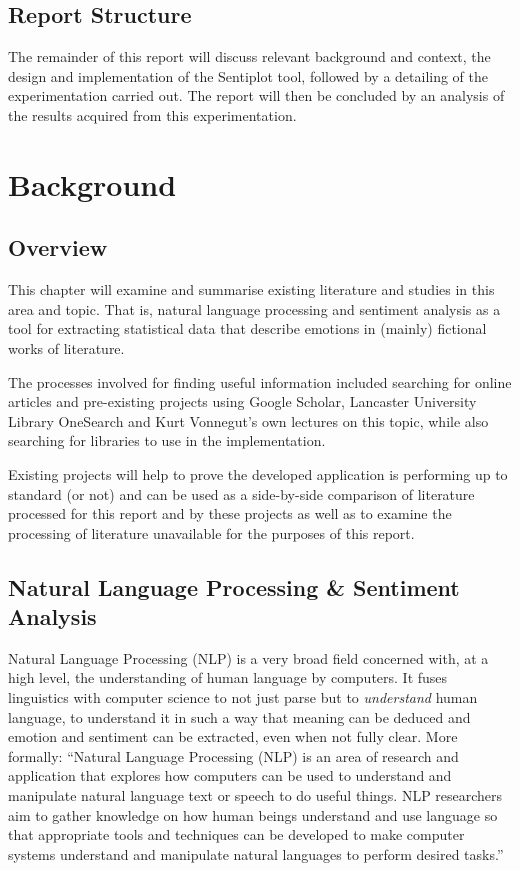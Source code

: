 \documentclass{article}
\begin{document}
{    \subsection{Report Structure}
        The remainder of this report will discuss relevant background and context, the design and implementation of the Sentiplot tool, followed by a detailing of the experimentation carried out. The report will then be concluded by an analysis of the results acquired from this experimentation. \citep{reagan2016emotional}
\newpage
\section{Background}
\label{sec:background)}
    \subsection{Overview}
        This chapter will examine and summarise existing literature and studies in this area and topic. That is, natural language processing and sentiment analysis as a tool for extracting statistical data that describe emotions in (mainly) fictional works of literature.

        The processes involved for finding useful information included searching for online articles and pre-existing projects using Google Scholar, Lancaster University Library OneSearch and Kurt Vonnegut’s own lectures on this topic, while also searching for libraries to use in the implementation.

        Existing projects will help to prove the developed application is performing up to standard (or not) and can be used as a side-by-side comparison of literature processed for this report and by these projects as well as to examine the processing of literature unavailable for the purposes of this report.
    \subsection{Natural Language Processing \& Sentiment Analysis}
        Natural Language Processing (NLP) is a very broad field concerned with, at a high level, the understanding of human language by computers. It fuses linguistics with computer science to not just parse but to \textit{understand} human language, to understand it in such a way that meaning can be deduced and emotion and sentiment can be extracted, even when not fully clear. More formally: ``Natural Language Processing (NLP) is an area of research and application that explores how computers can be used to understand and manipulate natural language text or speech to do useful things. NLP researchers aim to gather knowledge on how human beings understand and use language so that appropriate tools and techniques can be developed to make computer systems understand and manipulate natural languages to perform desired tasks.'' \citep{chowdhury2003natural}

}
\end{document}
